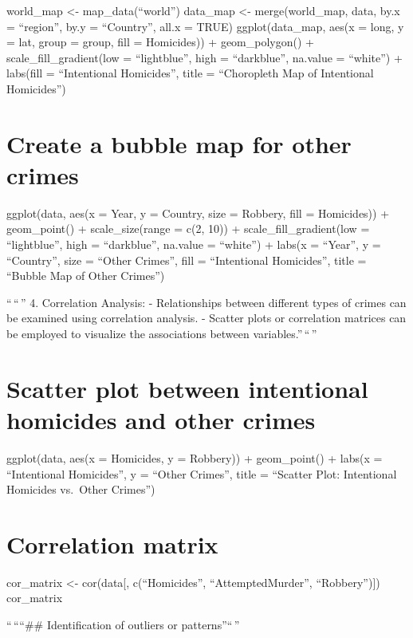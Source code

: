 \documentclass[
]{article}
\begin{document}
world\_map \textless- map\_data(``world'') data\_map \textless-
merge(world\_map, data, by.x = ``region'', by.y = ``Country'', all.x =
TRUE) ggplot(data\_map, aes(x = long, y = lat, group = group, fill =
Homicides)) + geom\_polygon() + scale\_fill\_gradient(low =
``lightblue'', high = ``darkblue'', na.value = ``white'') + labs(fill =
``Intentional Homicides'', title = ``Choropleth Map of Intentional
Homicides'')

\hypertarget{create-a-bubble-map-for-other-crimes}{%
\section{Create a bubble map for other
crimes}\label{create-a-bubble-map-for-other-crimes}}

ggplot(data, aes(x = Year, y = Country, size = Robbery, fill =
Homicides)) + geom\_point() + scale\_size(range = c(2, 10)) +
scale\_fill\_gradient(low = ``lightblue'', high = ``darkblue'', na.value
= ``white'') + labs(x = ``Year'', y = ``Country'', size = ``Other
Crimes'', fill = ``Intentional Homicides'', title = ``Bubble Map of
Other Crimes'')

``\,``\,'' 4. Correlation Analysis: - Relationships between different
types of crimes can be examined using correlation analysis. - Scatter
plots or correlation matrices can be employed to visualize the
associations between variables.''\,``\,''

\hypertarget{scatter-plot-between-intentional-homicides-and-other-crimes}{%
\section{Scatter plot between intentional homicides and other
crimes}\label{scatter-plot-between-intentional-homicides-and-other-crimes}}

ggplot(data, aes(x = Homicides, y = Robbery)) + geom\_point() + labs(x =
``Intentional Homicides'', y = ``Other Crimes'', title = ``Scatter Plot:
Intentional Homicides vs.~Other Crimes'')

\hypertarget{correlation-matrix}{%
\section{Correlation matrix}\label{correlation-matrix}}

cor\_matrix \textless- cor(data{[}, c(``Homicides'',
``AttemptedMurder'', ``Robbery''){]}) cor\_matrix

``\,````\#\# Identification of outliers or patterns''``\,''
\end{document}
